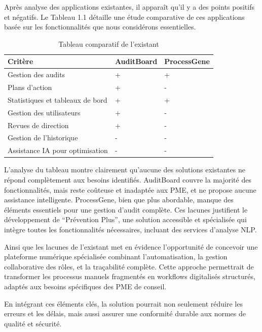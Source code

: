 \noindent Après analyse des applications existantes, il apparaît qu'il y a des points positifs et négatifs. Le Tableau 1.1 détaille une étude comparative de ces applications basée sur les fonctionnalités que nous considérons essentielles.

\begin{table}[h]
\small
\centering
\setlength{\tabcolsep}{4pt}
\caption{Tableau comparatif de l'existant}
\label{table:comparaison-verticale}
\begin{tabularx}{\textwidth}{|l|>{\centering\arraybackslash}X|>{\centering\arraybackslash}X|}
\hline
\textbf{Critère} & \textbf{AuditBoard} & \textbf{ProcessGene} \\ \hline
Gestion des audits & + & + \\ \hline
Plans d'action & + & - \\ \hline
Statistiques et tableaux de bord & + & + \\ \hline
Gestion des utilisateurs & + & - \\ \hline
Revues de direction & + & - \\ \hline
Gestion de l'historique & - & - \\ \hline
Assistance IA pour optimisation & - & - \\ \hline
\end{tabularx}
\end{table}

\noindent L'analyse du tableau montre clairement qu'aucune des solutions existantes ne répond complètement aux besoins identifiés. AuditBoard couvre la majorité des fonctionnalités, mais reste coûteuse et inadaptée aux PME, et ne propose aucune assistance intelligente. ProcessGene, bien que plus abordable, manque des éléments essentiels pour une gestion d'audit complète. Ces lacunes justifient le développement de ``Prévention Plus'', une solution accessible et spécialisée qui intègre toutes les fonctionnalités nécessaires, incluant des services d'analyse NLP.

\noindent Ainsi que les lacunes de l'existant met en évidence l'opportunité de concevoir une plateforme numérique spécialisée combinant l'automatisation, la gestion collaborative des rôles, et la traçabilité complète. Cette approche permettrait de transformer les processus manuels fragmentés en workflows digitalisés structurés, adaptés aux besoins spécifiques des PME de conseil.

En intégrant ces éléments clés, la solution pourrait non seulement réduire les erreurs et les délais, mais aussi assurer une conformité durable aux normes de qualité et sécurité.

